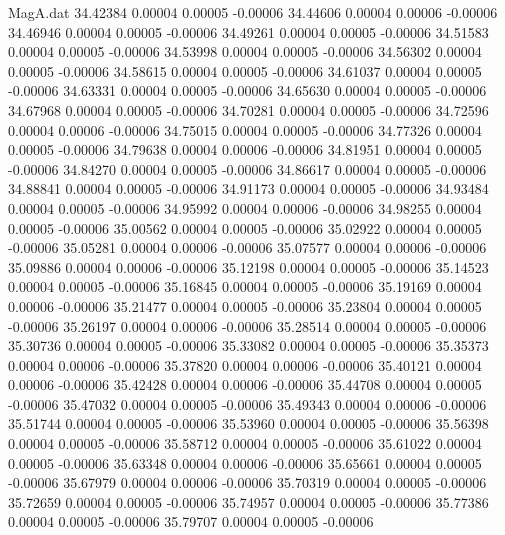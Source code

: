 \begin{filecontents}{MagA.dat}
  34.42384    0.00004    0.00005   -0.00006
  34.44606    0.00004    0.00006   -0.00006
  34.46946    0.00004    0.00005   -0.00006
  34.49261    0.00004    0.00005   -0.00006
  34.51583    0.00004    0.00005   -0.00006
  34.53998    0.00004    0.00005   -0.00006
  34.56302    0.00004    0.00005   -0.00006
  34.58615    0.00004    0.00005   -0.00006
  34.61037    0.00004    0.00005   -0.00006
  34.63331    0.00004    0.00005   -0.00006
  34.65630    0.00004    0.00005   -0.00006
  34.67968    0.00004    0.00005   -0.00006
  34.70281    0.00004    0.00005   -0.00006
  34.72596    0.00004    0.00006   -0.00006
  34.75015    0.00004    0.00005   -0.00006
  34.77326    0.00004    0.00005   -0.00006
  34.79638    0.00004    0.00006   -0.00006
  34.81951    0.00004    0.00005   -0.00006
  34.84270    0.00004    0.00005   -0.00006
  34.86617    0.00004    0.00005   -0.00006
  34.88841    0.00004    0.00005   -0.00006
  34.91173    0.00004    0.00005   -0.00006
  34.93484    0.00004    0.00005   -0.00006
  34.95992    0.00004    0.00006   -0.00006
  34.98255    0.00004    0.00005   -0.00006
  35.00562    0.00004    0.00005   -0.00006
  35.02922    0.00004    0.00005   -0.00006
  35.05281    0.00004    0.00006   -0.00006
  35.07577    0.00004    0.00006   -0.00006
  35.09886    0.00004    0.00006   -0.00006
  35.12198    0.00004    0.00005   -0.00006
  35.14523    0.00004    0.00005   -0.00006
  35.16845    0.00004    0.00005   -0.00006
  35.19169    0.00004    0.00006   -0.00006
  35.21477    0.00004    0.00005   -0.00006
  35.23804    0.00004    0.00005   -0.00006
  35.26197    0.00004    0.00006   -0.00006
  35.28514    0.00004    0.00005   -0.00006
  35.30736    0.00004    0.00005   -0.00006
  35.33082    0.00004    0.00005   -0.00006
  35.35373    0.00004    0.00006   -0.00006
  35.37820    0.00004    0.00006   -0.00006
  35.40121    0.00004    0.00006   -0.00006
  35.42428    0.00004    0.00006   -0.00006
  35.44708    0.00004    0.00005   -0.00006
  35.47032    0.00004    0.00005   -0.00006
  35.49343    0.00004    0.00006   -0.00006
  35.51744    0.00004    0.00005   -0.00006
  35.53960    0.00004    0.00005   -0.00006
  35.56398    0.00004    0.00005   -0.00006
  35.58712    0.00004    0.00005   -0.00006
  35.61022    0.00004    0.00005   -0.00006
  35.63348    0.00004    0.00006   -0.00006
  35.65661    0.00004    0.00005   -0.00006
  35.67979    0.00004    0.00006   -0.00006
  35.70319    0.00004    0.00005   -0.00006
  35.72659    0.00004    0.00005   -0.00006
  35.74957    0.00004    0.00005   -0.00006
  35.77386    0.00004    0.00005   -0.00006
  35.79707    0.00004    0.00005   -0.00006

\end{filecontents}
